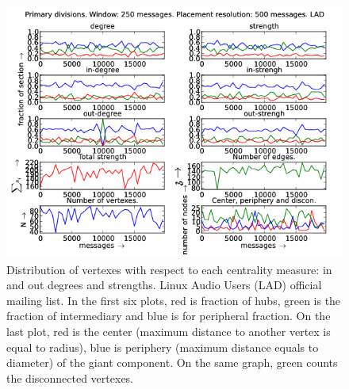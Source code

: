 \documentclass[%
 aip,
 jmp,%
 amsmath,amssymb,
 reprint,%
]{revtex4-1}
\begin{document}
\begin{figure}[hbtp] 
   \centering
        \includegraphics[width=\textwidth]{figs/LAD/250}
    \caption{Distribution of vertexes with respect to each centrality measure: in and out degrees and strengths. Linux Audio Users (LAD) official mailing list. In the first six plots, red is fraction of hubs, green is the fraction of intermediary and blue is for peripheral fraction. On the last plot, red is the center (maximum distance to another vertex is equal to radius), blue is periphery (maximum distance equals to diameter) of the giant component. On the same graph, green counts the disconnected vertexes.}
    \label{fig:lad250}
\end{figure}
\end{document}
